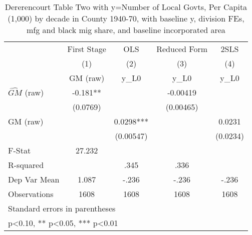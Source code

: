 \begin{table}[htbp]\centering
\def\sym#1{\ifmmode^{#1}\else\(^{#1}\)\fi}
\caption{Dererencourt Table Two with y=Number of Local Govts, Per Capita (1,000) by decade in County 1940-70, with baseline y, division FEs, mfg and black mig share, and baseline incorporated area}
\begin{tabular}{l*{4}{c}}
\toprule
                    & First Stage   &         OLS   &Reduced Form   &        2SLS   \\
                    &\multicolumn{1}{c}{(1)}&\multicolumn{1}{c}{(2)}&\multicolumn{1}{c}{(3)}&\multicolumn{1}{c}{(4)}\\
                    &\multicolumn{1}{c}{GM  (raw)}&\multicolumn{1}{c}{y\_L0}&\multicolumn{1}{c}{y\_L0}&\multicolumn{1}{c}{y\_L0}\\
\midrule
$\hat{GM}$ (raw)    &      -0.181** &               &    -0.00419   &               \\
                    &    (0.0769)   &               &   (0.00465)   &               \\
\addlinespace
GM  (raw)           &               &      0.0298***&               &      0.0231   \\
                    &               &   (0.00547)   &               &    (0.0234)   \\
\midrule
F-Stat              &      27.232   &               &               &               \\
R-squared           &               &        .345   &        .336   &               \\
Dep Var Mean        &       1.087   &       -.236   &       -.236   &       -.236   \\
Observations        &        1608   &        1608   &        1608   &        1608   \\
\bottomrule
\multicolumn{5}{l}{\footnotesize Standard errors in parentheses}\\
\multicolumn{5}{l}{\footnotesize * p<0.10, ** p<0.05, *** p<0.01}\\
\end{tabular}
\end{table}

